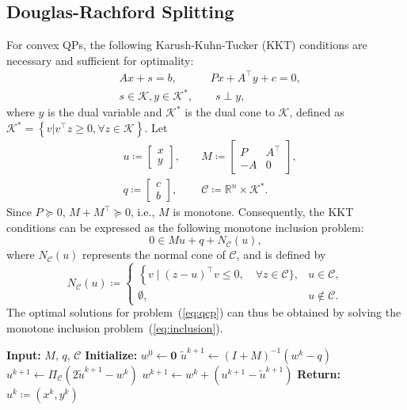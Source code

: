 \documentclass[10pt]{article} %
\begin{document}
\subsection{Douglas-Rachford Splitting}
For convex QPs, the following Karush-Kuhn-Tucker (KKT) conditions are necessary and sufficient for optimality:
\begin{equation*}
    \begin{aligned}
        & Ax+s=b, \quad \quad \quad Px+A^\top y + c = 0, \\ 
        & s\in\mathcal{K}, y \in \mathcal{K}^*,
        \quad \quad s \perp y,
    \end{aligned}
\end{equation*}
where $y$ is the dual variable and $\mathcal{K}^*$ is the dual cone to $\mathcal{K}$, defined as 
$\mathcal{K}^* = \left\{v|v^\top z \geq 0, \forall z \in \mathcal{K}\right\}$.
Let
\begin{equation*}
\begin{aligned}
&u \coloneqq \begin{bmatrix}
x \\
y
\end{bmatrix}, 
&& \; M \coloneqq \begin{bmatrix}
P & A^{\top} \\
-A & 0
\end{bmatrix}, \\
&q \coloneqq \begin{bmatrix}
c \\
b
\end{bmatrix}, 
&&\; \mathcal{C} \coloneqq \mathbb{R}^n \times \mathcal{K}^*.
\end{aligned}
\end{equation*}
Since $P\succeq 0$, $M+M^\top \succeq 0$, i.e., $M$ is monotone.
Consequently, the KKT conditions can be expressed as the following monotone inclusion problem:
\begin{equation}
\label{eq:inclusion}
    0 \in M u + q + N_{\mathcal{C}}(u),
\end{equation}
where $N_\mathcal{C}(u)$ represents the normal cone of $\mathcal{C}$, and is defined by
$$
N_{\mathcal{C}}(u) \coloneqq \begin{cases}\left\{v \mid(z-u)^{\top} v \leq 0\right.,\quad \forall z \in \mathcal{C}\}, & u \in \mathcal{C}, \\ \emptyset, & u \notin \mathcal{C} .\end{cases}
$$
The optimal solutions for problem~(\ref{eq:qcp}) can thus be obtained by solving the monotone inclusion problem~(\ref{eq:inclusion}).
\begin{algorithm}[ht]
\caption{Douglas-Rachford Splitting}\label{alg:dr}
\begin{algorithmic}[1]
\STATE \textbf{Input:} $M$, $q$, $\mathcal{C}$
\STATE \textbf{Initialize:} $w^0 \gets \mathbf{0}$ 
    \STATE $\tilde{u}^{k+1} \gets (I+M)^{-1} (w^k - q)$ \label{line:inverse} 
    \STATE $u^{k+1} \gets \Pi_\mathcal{C}\left(2 \tilde{u}^{k+1} - w^k\right)$
    \STATE $w^{k+1} \gets w^k + (u^{k+1} - \tilde{u}^{k+1})$
\ENDFOR
\STATE \textbf{Return:} $u^k \coloneqq (x^k, y^k)$
\end{algorithmic}
\end{algorithm}
\end{document}
